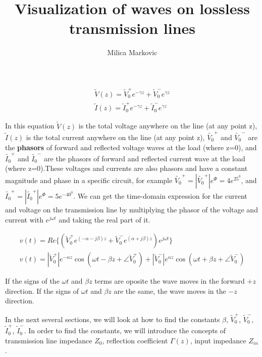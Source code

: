 \documentclass{ximera}
\title{Visualization of waves on lossless  transmission lines}
\author{Milica Markovic}
\begin{document}
  
\begin{abstract}  

\end{abstract}  
\maketitle    


\begin{eqnarray}
\tilde{V}(z)=\tilde{V}_0^+ e^{-\gamma z} + \tilde{V}_0^- e^{\gamma z} \nonumber \\ \nonumber
\tilde{I}(z)=\tilde{I}_0^+ e^{-\gamma z} + \tilde{I}_0^- e^{\gamma z}
\end{eqnarray}

In this equation $\tilde{V}(z)$ is the total voltage anywhere on the line (at any point z), $\tilde{I}(z)$ is the total current anywhere on the line (at any point z), $\tilde{V_0}^+$ and $\tilde{V_0}^-$ are the {\bf
phasors} of forward and
reflected voltage waves at the load (where z=0), and $\tilde{I_0}^+$ and $\tilde{I_0}^-$ are the phasors of forward and
reflected current wave at the load (where z=0).These voltages and currents are also phasors and have a constant magnitude and phase in a specific circuit, for example $\tilde{V_0}^+=|\tilde{V_0}^+| e^\Phi=4e^{25^0}$, and $\tilde{I_0}^+=|\tilde{I_0}^+| e^\Phi=5e^{-40^0}$.
We can get the time-domain expression for the current and voltage on the
transmission line by multiplying the phasor of the voltage and current with $e^{j \omega t}$ and taking the real part of it.

\begin{eqnarray}
v(t)=Re\{ (\tilde{V}_0^+  e^{(-\alpha - j \beta) z} + \tilde{V}_0^- e^{(\alpha + j
 \beta) z})e^{j \omega t} \}  \nonumber \\ 
v(t)=|\tilde{V}_0^+| e^{ - \alpha z} \cos(\omega t - \beta z + \angle \tilde{V}_0^+)+
|\tilde{V}_0^-|e^{\alpha z} \cos(\omega t + \beta z + \angle \tilde{V}_0^-) \label{tdeq}
\end{eqnarray}

If the signs of the $\omega t$ and
$\beta z$ terms are oposite the wave moves in the forward $+z$
direction. If the signs of $\omega t$ and $\beta z$ are the same, the
wave moves in the $-z$ direction.

In the next several sections, we will look at how to find the constants $\beta$, $\tilde{V}_0^+  $, $ \tilde{V}_0^-$, $\tilde{I}_0^+ $, $\tilde{I}_0^-$. In order to find the constants, we will introduce the concepts of transmission line impedance $Z_0$, reflection coefficient $\Gamma(z)$, input impedance $Z_{in}$. 
\end{document}

